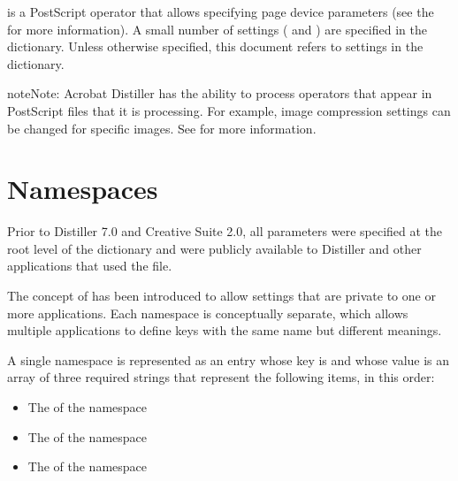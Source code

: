 \documentclass[letterpaper,12pt,english,openany,oneside]{sphinxmanual}
\begin{document}
 is a PostScript operator that allows specifying page device parameters (see the  for more information). A small number of settings ( and  ) are specified in the  dictionary. Unless otherwise specified, this document refers to settings in the  dictionary.

\begin{sphinxadmonition}{note}{Note:}
Acrobat Distiller has the ability to process  operators that appear in PostScript files that it is processing. For example, image compression settings can be changed for specific images. See  for more information.
\end{sphinxadmonition}




\section{Namespaces}
\label{\detokenize{index:namespaces}}
Prior to Distiller 7.0 and Creative Suite 2.0, all parameters were specified at the root level of the  dictionary and were publicly available to Distiller and other applications that used the file.

The concept of  has been introduced to allow settings that are private to one or more applications. Each namespace is conceptually separate, which allows multiple applications to define keys with the same name but different meanings.

A single namespace is represented as an entry whose key is  and whose value is an array of three required strings that represent the following items, in this order:
\begin{itemize}
\item {} 
The  of the namespace

\item {} 
The  of the namespace

\item {} 
The  of the namespace

\end{itemize}
\end{document}
